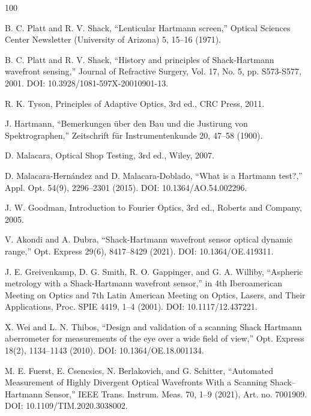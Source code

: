 \documentclass[letterpaper,12pt,oneside]{book}
\begin{document}
\renewcommand{\bibname}{Referencias} %
\begin{thebibliography}{100}
	
	B. C. Platt and R. V. Shack, ``Lenticular Hartmann screen,'' Optical Sciences Center Newsletter (University of Arizona) 5, 15--16 (1971).
	
	B. C. Platt and R. V. Shack, ``History and principles of Shack-Hartmann wavefront sensing,'' Journal of Refractive Surgery, Vol. 17, No. 5, pp. S573-S577, 2001. DOI: 10.3928/1081-597X-20010901-13.
	
	R. K. Tyson, Principles of Adaptive Optics, 3rd ed., CRC Press, 2011.
	
	J. Hartmann, ``Bemerkungen über den Bau und die Justirung von Spektrographen,'' Zeitschrift für Instrumentenkunde 20, 47--58 (1900).
	
	D. Malacara, Optical Shop Testing, 3rd ed., Wiley, 2007.
	
	D. Malacara-Hernández and D. Malacara-Doblado, ``What is a Hartmann test?,'' Appl. Opt. 54(9), 2296--2301 (2015). DOI: 10.1364/AO.54.002296.

	J. W. Goodman, Introduction to Fourier Optics, 3rd ed., Roberts and Company, 2005.

	V. Akondi and A. Dubra, ``Shack-Hartmann wavefront sensor optical dynamic range,'' Opt. Express 29(6), 8417--8429 (2021). DOI: 10.1364/OE.419311.

	J. E. Greivenkamp, D. G. Smith, R. O. Gappinger, and G. A. Williby, ``Aspheric metrology with a Shack-Hartmann wavefront sensor,'' in 4th Iberoamerican Meeting on Optics and 7th Latin American Meeting on Optics, Lasers, and Their Applications, Proc. SPIE 4419, 1--4 (2001). DOI: 10.1117/12.437221.
	
	X. Wei and L. N. Thibos, ``Design and validation of a scanning Shack Hartmann aberrometer for measurements of the eye over a wide field of view,'' Opt. Express 18(2), 1134--1143 (2010). DOI: 10.1364/OE.18.001134.
	
	M. E. Fuerst, E. Csencsics, N. Berlakovich, and G. Schitter, ``Automated Measurement of Highly Divergent Optical Wavefronts With a Scanning Shack--Hartmann Sensor,'' IEEE Trans. Instrum. Meas. 70, 1--9 (2021), Art. no. 7001909. DOI: 10.1109/TIM.2020.3038002.
	

\end{thebibliography}
\end{document}
